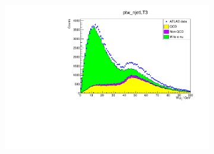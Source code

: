 \documentclass[11pt,a4paper,notitlepage]{scrartcl}
\begin{document}
\begin{figure}[h]
\begin{subfigure}{.32\linewidth}
		\includegraphics[width=\linewidth]{P1_pics/ptw_jets/ptw_njet2.pdf}
		\caption{}
	\end{subfigure}


\end{figure}
\end{document}
